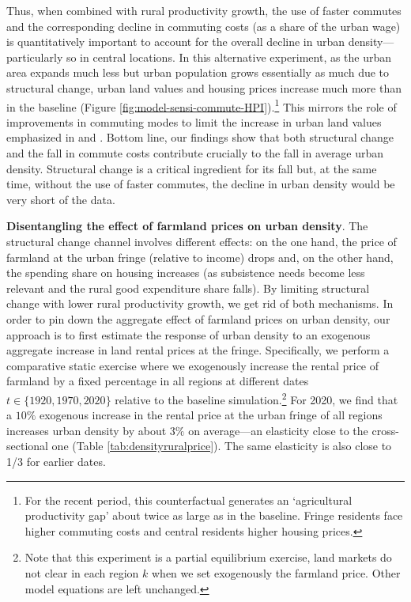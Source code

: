 \documentclass[./20250130-paper.tex]{subfiles}
\begin{document}
Thus, when combined with rural productivity growth, the use of faster commutes and the corresponding decline in commuting costs (as a share of the urban wage) is quantitatively important to account for the overall decline in urban density---particularly so in central locations. In this alternative experiment, as the urban area expands much less but urban population grows essentially as much due to structural change, urban land values and housing prices increase much more than in the baseline (Figure \ref{fig:model-sensi-commute-HPI}).\footnote{For the recent period, this counterfactual generates an `agricultural productivity gap' about twice as large as in the baseline. Fringe residents face higher commuting costs and central residents higher housing prices.} This mirrors the role of improvements in commuting modes to limit the increase in urban land values emphasized in \cite{heblichreddingsturm2018} and \cite{milessefton2020}. Bottom line, our findings show that both structural change and the fall in commute costs contribute crucially to the fall in average urban density. Structural change is a critical ingredient for its fall but, at the same time, without the use of faster commutes, the decline in urban density would be very short of the data.

\textbf{Disentangling the effect of farmland prices on urban density}. The structural change channel involves different effects: on the one hand, the price of farmland at the urban fringe (relative to income) drops and, on the other hand, the spending share on housing increases (as subsistence needs become less relevant and the rural good expenditure share falls). By limiting structural change with lower rural productivity growth, we get rid of both mechanisms. In order to pin down the aggregate effect of farmland prices on urban density, our approach is to first estimate the response of urban density to an exogenous aggregate increase in land rental prices at the fringe. Specifically, we perform a comparative static exercise where we exogenously increase the rental price of farmland by a fixed percentage in all regions at different dates $t \in \{1920, 1970, 2020\}$ relative to the baseline simulation.\footnote{Note that this experiment is a partial equilibrium exercise, land markets do not clear in each region $k$ when we set exogenously the farmland price. Other model equations are left unchanged.} For 2020, we find that a $10\%$ exogenous increase in the rental price at the urban fringe of all regions increases urban density by about $3\%$ on average---an elasticity close to the cross-sectional one (Table \ref{tab:densityruralprice}). The same elasticity is also close to 1/3 for earlier dates. 
\end{document}

